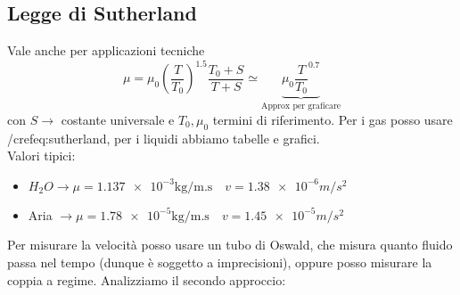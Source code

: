 \subsection{Legge di Sutherland}
Vale anche per applicazioni tecniche
\begin{equation}
  \label{eq:sutherland}
  \mu =\mu_0 (\frac{T}{T_0})^{1.5} \frac{T_0+S}{T+S} \simeq \underbrace{\mu_0\frac{T}{T_0}^{0.7}}_{\text{Approx per graficare}}
\end{equation}
con $S \to $ costante universale e $T_0,\mu_0$ termini di riferimento.
Per i gas posso usare /cref{eq:sutherland}, per i liquidi abbiamo tabelle e grafici.\\
Valori tipici:
\begin{itemize}
\item $ H_{2}O \to \mu =\num{1,137e-3 }\unit{\kilogram\per\metre.\second} \quad v = \num{1,38e-6 } \unit{m/s^2}$ 
\item Aria $\to \mu =\num{1,78e-5 }\unit{\kilogram\per\metre.\second} \quad v = \num{1,45e-5 } \unit{m/s^2}$ 
\end{itemize}
Per misurare la velocità posso usare un tubo di Oswald, che misura quanto fluido passa nel tempo (dunque è soggetto a imprecisioni), oppure posso misurare la coppia a regime.
Analizziamo il secondo approccio:

